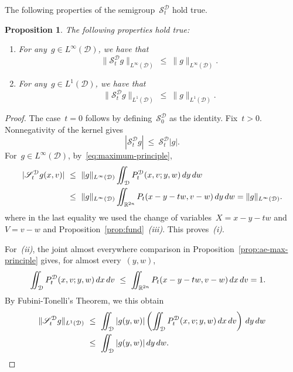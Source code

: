 \documentclass[leqno,10pt]{amsart}
\theoremstyle{plain}
\newtheorem{prop}{Proposition}[section]
\theoremstyle{remark}
\numberwithin{equation}{section}
\def\dx{\,{\rm d}x}
\def\dv{\,{\rm d}v}
\def\dw{\,{\rm d}w}
\def \d{\,{\rm d}}
\begin{document}
{The following properties of the semigroup~$\mathscr{S}_t^{\mathcal{D}}$ hold true.

\begin{prop}\label{prop:L1-Linf-contraction}
The following properties hold true:
\begin{enumerate}[\it (i)]
     \item For any~$g \in L^\infty(\mathcal{D})$, we have that
     \[
      \|\mathscr{S}_t^{\mathcal{D}}g\|_{L^\infty(\mathcal{D})}
      \ \leq\ \|g\|_{L^\infty(\mathcal{D})}.
     \]
    \item For any~$g \in L^1(\mathcal{D})$, we have that
     \[
      \|\mathscr{S}_t^{\mathcal{D}}g\|_{L^1(\mathcal{D})}
      \ \leq\ \|g\|_{L^1(\mathcal{D})}.
     \]
\end{enumerate}
\end{prop}

\begin{proof}
The case~$t=0$ follows by defining~$\mathscr{S}_0^{\mathcal{D}}$ as the
identity. Fix~$t>0$. Nonnegativity of the kernel gives
\[
|\mathscr{S}_t^{\mathcal{D}}g|
\ \leq\ \mathscr{S}_t^{\mathcal{D}}|g|.
\]
For~$g\in L^\infty(\mathcal{D})$, by~\eqref{eq:maximum-principle},
\[
\begin{aligned}
|\mathscr{S}_t^{\mathcal{D}}g(x,v)|
&\ \leq\ \|g\|_{L^\infty(\mathcal{D})}
 \iint_{\mathcal{D}}P_t^{\mathcal{D}}(x,v;y,w)\d y\dw
\\
&\ \leq\ \|g\|_{L^\infty(\mathcal{D})}
 \iint_{\mathbb{R}^{2n}}P_t(x-y-tw,v-w)\d y\dw
=\|g\|_{L^\infty(\mathcal{D})}.
\end{aligned}
\]
where in the last equality we used the change of variables~$X=x-y-tw$ and~$V=v-w$ and  Proposition~\ref{prop:fund}~\textit{(iii)}.
This proves~\textit{(i)}.

For~\textit{(ii)}, the joint almost everywhere comparison in
Proposition~\ref{prop:ae-max-principle} gives, for almost every~$(y,w)$,
\[
\begin{aligned}
\iint_{\mathcal{D}}P_t^{\mathcal{D}}(x,v;y,w)\dx\dv
&\ \leq\ \iint_{\mathbb{R}^{2n}}P_t(x-y-tw,v-w)\dx\dv
=1.
\end{aligned}
\]
By Fubini-Tonelli's Theorem, we this obtain
\[
\begin{aligned}
\|\mathscr{S}_t^{\mathcal{D}}g\|_{L^1(\mathcal{D})}
&\ \leq\ \iint_{\mathcal{D}}|g(y,w)|
 \left(\iint_{\mathcal{D}}P_t^{\mathcal{D}}(x,v;y,w)\dx\dv\right)
 \d y\dw
\\
&\ \leq\ \iint_{\mathcal{D}}|g(y,w)|\d y\dw.
\end{aligned}
\]
\end{proof}


}
\end{document}
